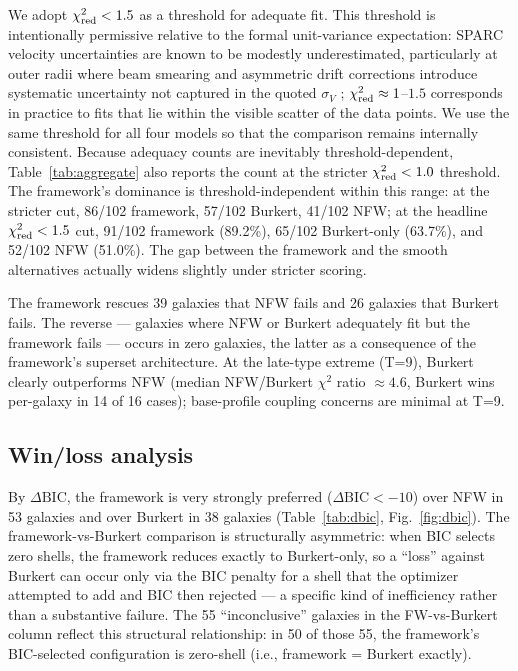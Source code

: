 We adopt $\chi^2_{\rm red} < 1.5$ as a threshold for adequate fit. This threshold is intentionally permissive relative to the formal unit-variance expectation: SPARC velocity uncertainties are known to be modestly underestimated, particularly at outer radii where beam smearing and asymmetric drift corrections introduce systematic uncertainty not captured in the quoted $\sigma_V$ \citep[][\S 3.2]{Lelli2016}; $\chi^2_{\rm red} \approx 1$--$1.5$ corresponds in practice to fits that lie within the visible scatter of the data points. We use the same threshold for all four models so that the comparison remains internally consistent. Because adequacy counts are inevitably threshold-dependent, Table~\ref{tab:aggregate} also reports the count at the stricter $\chi^2_{\rm red} < 1.0$ threshold. The framework's dominance is threshold-independent within this range: at the stricter cut, 86/102 framework, 57/102 Burkert, 41/102 NFW; at the headline $\chi^2_{\rm red} < 1.5$ cut, 91/102 framework (89.2\%), 65/102 Burkert-only (63.7\%), and 52/102 NFW (51.0\%). The gap between the framework and the smooth alternatives actually widens slightly under stricter scoring.

The framework rescues 39 galaxies that NFW fails and 26 galaxies that Burkert fails. The reverse --- galaxies where NFW or Burkert adequately fit but the framework fails --- occurs in zero galaxies, the latter as a consequence of the framework's superset architecture. At the late-type extreme (T=9), Burkert clearly outperforms NFW (median NFW/Burkert $\chi^2$ ratio $\approx 4.6$, Burkert wins per-galaxy in 14 of 16 cases); base-profile coupling concerns are minimal at T=9.

\subsection{Win/loss analysis}

By $\Delta\mathrm{BIC}$, the framework is very strongly preferred ($\Delta\mathrm{BIC} < -10$) over NFW in 53 galaxies and over Burkert in 38 galaxies (Table~\ref{tab:dbic}, Fig.~\ref{fig:dbic}). The framework-vs-Burkert comparison is structurally asymmetric: when BIC selects zero shells, the framework reduces exactly to Burkert-only, so a ``loss'' against Burkert can occur only via the BIC penalty for a shell that the optimizer attempted to add and BIC then rejected --- a specific kind of inefficiency rather than a substantive failure. The 55 ``inconclusive'' galaxies in the FW-vs-Burkert column reflect this structural relationship: in 50 of those 55, the framework's BIC-selected configuration is zero-shell (i.e., framework = Burkert exactly).

